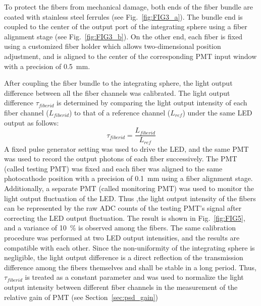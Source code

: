 \documentclass{nst}
\providecommand{\DIFadd}[1]{{\protect\color{yellow} \sf #1}} %
\providecommand{\DIFaddbegin}{} %
\providecommand{\DIFaddend}{} %
\providecommand{\DIFdelbegin}{} %
\providecommand{\DIFdelend}{} %
\begin{document}
To protect the fibers from mechanical damage, both ends of the fiber bundle are coated with stainless steel ferrules (see Fig.~\ref{fig:FIG3_a}).
The bundle end is coupled to the center of the output port of the integrating sphere using a fiber alignment stage (see Fig.~\ref{fig:FIG3_b}).
On the other end, each fiber is fixed using a customized fiber holder which allows two-dimensional position adjustment, and is aligned to the center of the corresponding PMT input window with a precision of \SI{0.5}{\milli\meter}.

After coupling the fiber bundle to the integrating sphere, the light output difference between all the fiber channels was calibrated. 
The light output difference $\tau_{fiberid}$ is determined by comparing the light output intensity of each fiber channel ($L_{fiberid}$) to that of a reference channel ($L_{ref}$) under the same LED output as follows:
\begin{equation}
	\tau_{fiberid} = \frac{L_{fiberid}}{L_{ref}}
\end{equation} 
A fixed pulse generator setting was used to drive the LED, and the same PMT was used to record the output photons of each fiber successively.
The PMT (called testing PMT) was fixed and each fiber was aligned to the same photocathode position with a precision of \SI{0.1}{\milli\meter} using a fiber alignment stage.
Additionally, a separate PMT (called monitoring PMT) was used to monitor the light output fluctuation of the LED.
Thus ,the light output intensity of the fibers can be represented by the raw ADC counts of the testing PMT's signal after correcting the LED output fluctuation.
The result is shown in Fig.~\ref{fig:FIG5}, and a variance of \SI{10}{\percent} is observed among the fibers.
The same calibration procedure was performed at two LED output intensities, and the results are compatible with each other. 
\DIFdelbegin \DIFdelend \DIFaddbegin \DIFadd{Since }\DIFaddend the non-uniformity of the integrating sphere is negligible, the light output difference is a direct reflection of the transmission difference among the fibers themselves and shall be stable in a long period.
Thus, \DIFdelbegin \DIFdelend \DIFaddbegin \DIFadd{$\tau_{fiberid}$ }\DIFaddend is treated as a constant parameter and was used to normalize the light output intensity between different fiber channels in the measurement of the relative gain of PMT (see Section~\ref{sec:psd_gain})
\end{document}
